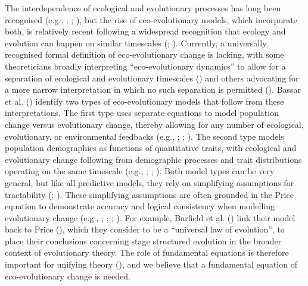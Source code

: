 \documentclass[
]{article}
\begin{document}
The interdependence of ecological and evolutionary processes has long
been recognised (e.g., ;
;
), but the rise of
eco-evolutionary models, which incorporate both, is relatively recent
following a widespread recognition that ecology and evolution can happen
on similar timescales (;
). Currently, a
universally recognised formal definition of eco-evolutionary change is
lacking, with some theoreticians broadly interpreting ``eco-evolutionary
dynamics'' to allow for a separation of ecological and evolutionary
timescales () and others
advocating for a more narrow interpretation in which no such separation
is permitted (). Bassar et
al. () identify two types of
eco-evolutionary models that follow from these interpretations. The
first type uses separate equations to model population change versus
evolutionary change, thereby allowing for any number of ecological,
evolutionary, or environmental feedbacks (e.g.,
; ; ). The second type
models population demographics as functions of quantitative traits, with
ecological and evolutionary change following from demographic processes
and trait distributions operating on the same timescale (e.g.,
;
;
). Both model types can be
very general, but like all predictive models, they rely on simplifying
assumptions for tractability (;
). These simplifying assumptions are
often grounded in the Price equation to demonstrate accuracy and logical
consistency when modelling evolutionary change (e.g.,
;
;
;
). For example, Barfield et al.
() link their model back to Price
(), which they consider to be a
``universal law of evolution'', to place their conclusions concerning
stage structured evolution in the broader context of evolutionary
theory. The role of fundamental equations is therefore important for
unifying theory (),
and we believe that a fundamental equation of eco-evolutionary change is
needed.
\end{document}
